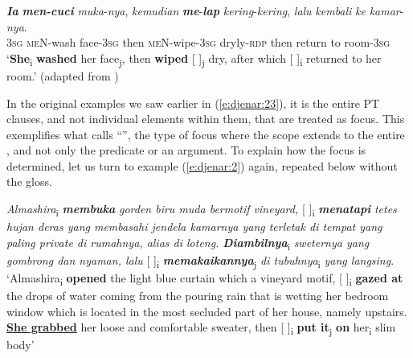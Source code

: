 \documentclass[output=paper
,modfonts
,nonflat]{langsci/langscibook}
\begin{document}
\begin{exe}
	\ex\label{e:djenar:25}
	\gll \textbf{\textit{Ia}} \textbf{\textit{men-cuci}} \textit{muka}-\textit{nya}, \textit{kemudian} \textbf{\textit{me}}-\textbf{\textit{lap}} \textit{kering}-\textit{kering}, \textit{lalu} \textit{kembali} \textit{ke} \textit{kamar}-\textit{nya}.\\
	3\textsc{sg} \textsc{meN}-wash face-\textsc{3sg} then \textsc{meN}-wipe-3\textsc{sg} dryly-\textsc{rdp} then return to room-\textsc{3sg}\\
	\glt ‘\textbf{She}\textsubscript{i} \textbf{washed} her face\textsubscript{j}, then \textbf{wiped} [ ]\textsubscript{j} dry, after which [ ]\textsubscript{i} returned to her room.’ \hfill (adapted from \citealt[119]{Krisna1977})
\end{exe}

\noindent
In the original examples we saw earlier in (\ref{e:djenar:23}), it is the entire PT clauses, and not individual elements within them, that are treated as focus. This exemplifies what \citet[233]{Lambrecht1994} calls “”, the type of focus where the scope extends to the entire , and not only the predicate or an argument. To explain how the focus is determined, let us turn to example (\ref{e:djenar:2}) again, repeated below without the gloss.

\begin{exe}
	\ex\label{e:djenar:26}
	\textit{Almashira}\textsubscript{i} \textbf{\textit{membuka}} \textit{gorden biru muda bermotif vineyard,} [ ]\textsubscript{i} \textbf{\textit{menatapi}} \textit{tetes hujan deras yang membasahi jendela kamarnya yang terletak di tempat yang paling private di rumahnya, alias di loteng.} \textbf{\textit{Diambilnya}}\textsubscript{i} \textit{sweternya yang gombrong dan nyaman, lalu} [ ]\textsubscript{i} \textbf{\textit{memakaikannya}}\textsubscript{j} \textit{di tubuhnya}\textsubscript{i} \textit{yang langsing}.
	\glt ‘Almashira\textsubscript{i} \textbf{opened} the light blue curtain which a vineyard motif, [ ]\textsubscript{i} \textbf{gazed at} the drops of water coming from the pouring rain that is wetting her bedroom window which is located in the most secluded part of her house, namely upstairs. \uline{\textbf{She grabbed}} her loose and comfortable sweater, then [ ]\textsubscript{i} \textbf{put it}\textsubscript{j} \textbf{on} her\textsubscript{i} slim body’ \hfill \citep[7]{Karina2008}
\end{exe}
\end{document}
